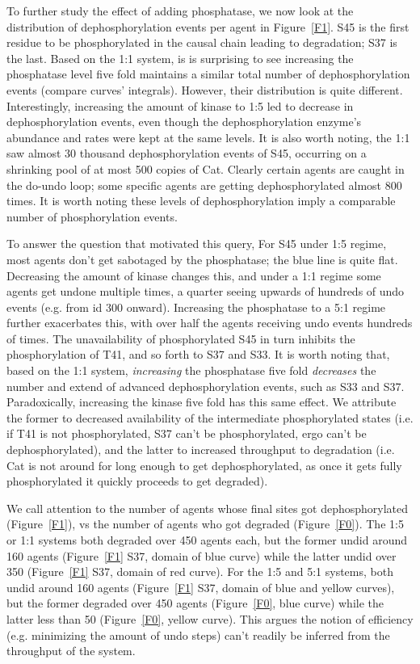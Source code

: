 To further study the effect of adding phosphatase, we now look at the
distribution of dephosphorylation events per agent in Figure~\ref{F1}.
S45 is the first residue to be phosphorylated in the causal chain
leading to degradation; S37 is the last. Based on the 1:1 system, is is surprising to
see increasing the phosphatase level five fold maintains a similar
total number of dephosphorylation events (compare curves’ integrals).
However, their distribution is quite different.
Interestingly, increasing the amount of kinase to 1:5 led to decrease
in dephosphorylation events, even though the dephosphorylation enzyme's
abundance and rates were kept at the same levels.
It is also worth noting, the 1:1 saw almost 30 thousand dephosphorylation
events of S45, occurring on a shrinking pool of at most 500 copies of Cat.
Clearly certain agents are caught in the do-undo loop; some specific
agents are getting dephosphorylated almost 800 times. It is worth noting
these levels of dephosphorylation imply a comparable number of
phosphorylation events.

To answer the question that motivated this query, For S45 under 1:5 regime,
most agents don’t get sabotaged by the phosphatase; the blue line is
quite flat. Decreasing the amount of kinase changes this, and
under a 1:1 regime some agents get undone multiple times, a quarter
seeing upwards of hundreds of undo events (e.g. from id 300
onward). Increasing the phosphatase to a 5:1 regime further
exacerbates this, with over half the agents receiving undo events
hundreds of times. The unavailability of phosphorylated S45 in turn
inhibits the phosphorylation of T41, and so forth to S37 and S33. It
is worth noting that, based on the 1:1 system, \emph{increasing} the
phosphatase five fold \emph{decreases} the number and extend of advanced
dephosphorylation events, such as S33 and S37. Paradoxically,
increasing the kinase five fold has this same effect. We attribute the
former to decreased availability of the intermediate phosphorylated
states (i.e. if T41 is not phosphorylated, S37 can’t be
phosphorylated, ergo can’t be dephosphorylated), and the latter to
increased throughput to degradation (i.e. Cat is not around for long
enough to get dephosphorylated, as once it gets fully phosphorylated it
quickly proceeds to get degraded).

We call attention to the number of agents whose final sites got
dephosphorylated (Figure~\ref{F1}), vs the number of agents who got
degraded (Figure~\ref{F0}). The 1:5 or 1:1 systems both degraded over
450 agents each, but the former undid around 160 agents (Figure~\ref{F1} S37, domain of blue curve) while the
latter undid over 350 (Figure~\ref{F1} S37, domain of red curve). For the 1:5 and 5:1 systems, both undid around
160 agents (Figure~\ref{F1} S37, domain of blue and yellow curves), but the former degraded over 450 agents (Figure~\ref{F0}, blue curve) while the latter
less than 50 (Figure~\ref{F0}, yellow curve). This argues the notion of efficiency (e.g. minimizing
the amount of undo steps) can’t readily be inferred from the
throughput of the system.


